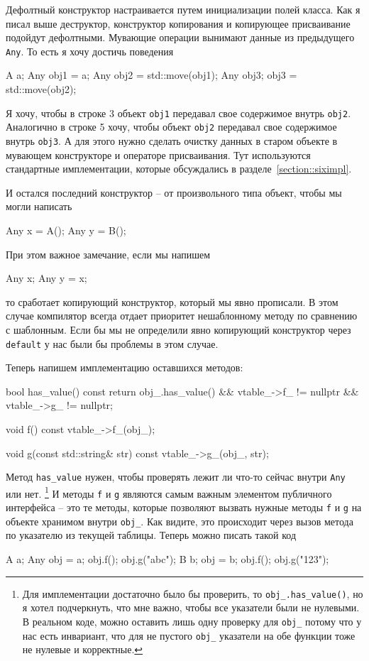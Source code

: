 Дефолтный конструктор настраивается путем инициализации полей класса.
Как я писал выше деструктор, конструктор копирования и копирующее присваивание подойдут дефолтными.
Мувающие операции вынимают данные из предыдущего \texttt{Any}.
То есть я хочу достичь поведения
\begin{cppcode}
A a;
Any obj1 = a;
Any obj2 = std::move(obj1);
Any obj3;
obj3 = std::move(obj2);
\end{cppcode}
Я хочу, чтобы в строке 3 объект \texttt{obj1} передавал свое содержимое внутрь \texttt{obj2}.
Аналогично в строке 5 хочу, чтобы объект \texttt{obj2} передавал свое содержимое внутрь \texttt{obj3}.
А для этого нужно сделать очистку данных в старом объекте в мувающем конструкторе и операторе присваивания.
Тут используются стандартные имплементации, которые обсуждались в разделе~\ref{section::siximpl}.

И остался последний конструктор -- от произвольного типа объект, чтобы мы могли написать
\begin{cppcode}
Any x = A();
Any y = B();
\end{cppcode}
При этом важное замечание, если мы напишем
\begin{cppcode}
Any x;
Any y = x;
\end{cppcode}
то сработает копирующий конструктор, который мы явно прописали.
В этом случае компилятор всегда отдает приоритет нешаблонному методу по сравнению с шаблонным.
Если бы мы не определили явно копирующий конструктор через \texttt{default} у нас были бы проблемы в этом случае.

Теперь напишем имплементацию оставшихся методов:
\begin{cppcode}
  bool has_value() const {
    return obj_.has_value() && vtable_->f_ != nullptr && vtable_->g_ != nullptr;
  }

  void f() const {
    vtable_->f_(obj_);
  }
  
  void g(const std::string& str) const {
    vtable_->g_(obj_, str);
  }
\end{cppcode}
Метод \texttt{has\_value} нужен, чтобы проверять лежит ли что-то сейчас внутри \texttt{Any} или нет.%
\footnote{Для имплементации достаточно было бы проверить, то \texttt{obj\_.has\_value()}, но я хотел подчеркнуть, что мне важно, чтобы все указатели были не нулевыми.
В реальном коде, можно оставить лишь одну проверку для \texttt{obj\_} потому что у нас есть инвариант, что для не пустого \texttt{obj\_} указатели на обе функции тоже не нулевые и корректные.}
И методы \texttt{f} и \texttt{g} являются самым важным элементом публичного интерфейса -- это те методы, которые позволяют вызвать нужные методы \texttt{f} и \texttt{g} на объекте хранимом внутри \texttt{obj\_}.
Как видите, это происходит через вызов метода по указателю из текущей таблицы.
Теперь можно писать такой код
\begin{cppcode}
A a;
Any obj = a;
obj.f();
obj.g("abc");
B b;
obj = b;
obj.f();
obj.g("123");
\end{cppcode}


